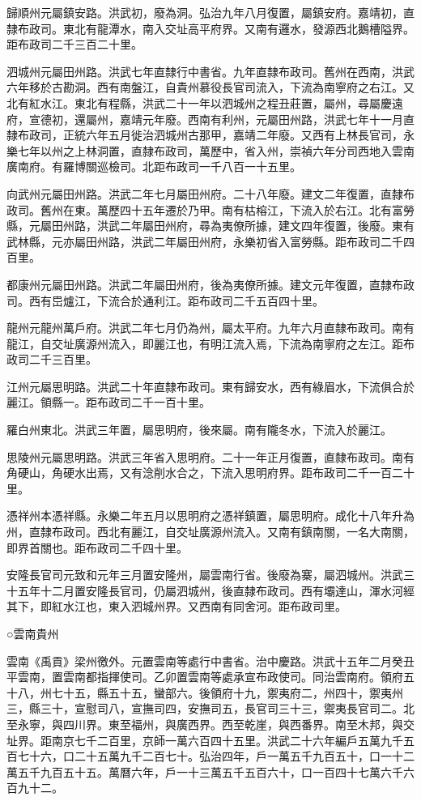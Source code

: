 歸順州元屬鎮安路。洪武初，廢為洞。弘治九年八月復置，屬鎮安府。嘉靖初，直隸布政司。東北有龍潭水，南入交址高平府界。又南有邏水，發源西北鵝槽隘界。距布政司二千三百二十里。

泗城州元屬田州路。洪武七年直隸行中書省。九年直隸布政司。舊州在西南，洪武六年移於古勘洞。西有南盤江，自貴州慕役長官司流入，下流為南寧府之右江。又北有紅水江。東北有程縣，洪武二十一年以泗城州之程丑莊置，屬州，尋屬慶遠府，宣德初，還屬州，嘉靖元年廢。西南有利州，元屬田州路，洪武七年十一月直隸布政司，正統六年五月徙治泗城州古那甲，嘉靖二年廢。又西有上林長官司，永樂七年以州之上林洞置，直隸布政司，萬歷中，省入州，崇禎六年分司西地入雲南廣南府。有羅博關巡檢司。北距布政司一千八百一十五里。

向武州元屬田州路。洪武二年七月屬田州府。二十八年廢。建文二年復置，直隸布政司。舊州在東。萬歷四十五年遷於乃甲。南有枯榕江，下流入於右江。北有富勞縣，元屬田州路，洪武二年屬田州府，尋為夷僚所據，建文四年復置，後廢。東有武林縣，元亦屬田州路，洪武二年屬田州府，永樂初省入富勞縣。距布政司二千四百里。

都康州元屬田州路。洪武二年屬田州府，後為夷僚所據。建文元年復置，直隸布政司。西有岊爐江，下流合於通利江。距布政司二千五百四十里。

龍州元龍州萬戶府。洪武二年七月仍為州，屬太平府。九年六月直隸布政司。南有龍江，自交址廣源州流入，即麗江也，有明江流入焉，下流為南寧府之左江。距布政司二千三百里。

江州元屬思明路。洪武二十年直隸布政司。東有歸安水，西有綠眉水，下流俱合於麗江。領縣一。距布政司二千一百十里。

羅白州東北。洪武三年置，屬思明府，後來屬。南有隴冬水，下流入於麗江。

思陵州元屬思明路。洪武三年省入思明府。二十一年正月復置，直隸布政司。南有角硬山，角硬水出焉，又有淰削水合之，下流入思明府界。距布政司二千一百二十里。

憑祥州本憑祥縣。永樂二年五月以思明府之憑祥鎮置，屬思明府。成化十八年升為州，直隸布政司。西北有麗江，自交址廣源州流入。又南有鎮南關，一名大南關，即界首關也。距布政司二千四十里。

安隆長官司元致和元年三月置安隆州，屬雲南行省。後廢為寨，屬泗城州。洪武三十五年十二月置安隆長官司，仍屬泗城州，後直隸布政司。西有壩達山，渾水河經其下，即紅水江也，東入泗城州界。又西南有同舍河。距布政司里。

○雲南貴州

雲南《禹貢》梁州徼外。元置雲南等處行中書省。治中慶路。洪武十五年二月癸丑平雲南，置雲南都指揮使司。乙卯置雲南等處承宣布政使司。同治雲南府。領府五十八，州七十五，縣五十五，蠻部六。後領府十九，禦夷府二，州四十，禦夷州三，縣三十，宣慰司八，宣撫司四，安撫司五，長官司三十三，禦夷長官司二。北至永寧，與四川界。東至福州，與廣西界。西至乾崖，與西番界。南至木邦，與交址界。距南京七千二百里，京師一萬六百四十五里。洪武二十六年編戶五萬九千五百七十六，口二十五萬九千二百七十。弘治四年，戶一萬五千九百五十，口一十二萬五千九百五十五。萬曆六年，戶一十三萬五千五百六十，口一百四十七萬六千六百九十二。

